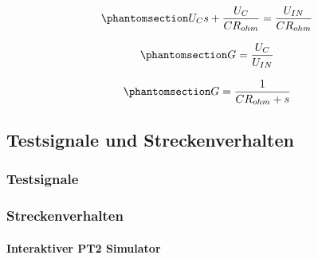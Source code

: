 \documentclass[
  letterpaper,
  DIV=11]{scrreprt}
\let\oldparagraph\paragraph
\renewcommand{\paragraph}[1]{\oldparagraph{#1}\mbox{}}
\begin{document}
\begin{equation}\phantomsection\label{eq-Dummy}{
U_{C} s + \frac{U_{C}}{C R_{ohm}} = \frac{U_{IN}}{C R_{ohm}}
}\end{equation}

\begin{equation}\phantomsection\label{eq-Dummy}{
G = \frac{U_{C}}{U_{IN}}
}\end{equation}

\begin{equation}\phantomsection\label{eq-Dummy}{
G = \frac{1}{C R_{ohm} + s}
}\end{equation}

\subsection{Testsignale und Streckenverhalten}\label{sec-TestStrecke}

\subsubsection{Testsignale}\label{testsignale}

\subsubsection{Streckenverhalten}\label{streckenverhalten}

\paragraph{Interaktiver PT2 Simulator}\label{interaktiver-pt2-simulator}
\end{document}
